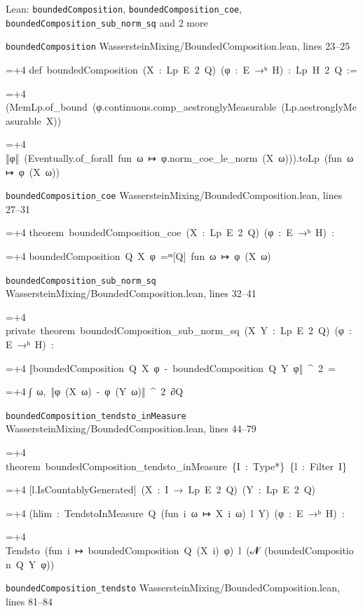\documentclass[11pt,a4paper]{report}
\newlength{\leancharwidth}
\newenvironment{leancode}{\par\smallskip\begingroup\ttfamily\footnotesize\raggedright
  \settowidth{\leancharwidth}{M}\setlength{\parskip}{0pt}\setlength{\parindent}{0pt}
  \frenchspacing}{\par\endgroup\smallskip}
\newcommand{\leanline}[2]{\hangindent=\dimexpr#1\leancharwidth+4\leancharwidth\relax
  \hangafter=1\noindent\hspace*{#1\leancharwidth}#2\par}
\newcommand{\leansource}[1]{\par{\footnotesize\color{leanmuted}#1}\par}
\begin{document}
\begin{leanbox}{Lean: \texttt{boundedComposition}, \texttt{boundedComposition\_\allowbreak{}coe}, \texttt{boundedComposition\_\allowbreak{}sub\_\allowbreak{}norm\_\allowbreak{}sq} and 2 more}
\leansource{\texttt{boundedComposition} \quad WassersteinMixing/\allowbreak{}BoundedComposition.lean, lines 23–25}
\begin{leancode}
\leanline{0}{def\ boundedComposition\ (X\ :\ Lp\ E\ 2\ Q)\ (φ\ :\ E\ →ᵇ\ H)\ :\ Lp\ H\ 2\ Q\ :=}
\leanline{2}{(MemLp.of\_bound\ (φ.continuous.comp\_aestronglyMeasurable\ (Lp.aestronglyMeasurable\ X))}
\leanline{4}{‖φ‖\ (Eventually.of\_forall\ fun\ ω\ ↦\ φ.norm\_coe\_le\_norm\ (X\ ω))).toLp\ (fun\ ω\ ↦\ φ\ (X\ ω))}
\end{leancode}
\leansource{\texttt{boundedComposition\_\allowbreak{}coe} \quad WassersteinMixing/\allowbreak{}BoundedComposition.lean, lines 27–31}
\begin{leancode}
\leanline{0}{theorem\ boundedComposition\_coe\ (X\ :\ Lp\ E\ 2\ Q)\ (φ\ :\ E\ →ᵇ\ H)\ :}
\leanline{4}{boundedComposition\ Q\ X\ φ\ =ᵐ[Q]\ fun\ ω\ ↦\ φ\ (X\ ω)}
\end{leancode}
\leansource{\texttt{boundedComposition\_\allowbreak{}sub\_\allowbreak{}norm\_\allowbreak{}sq} \quad WassersteinMixing/\allowbreak{}BoundedComposition.lean, lines 32–41}
\begin{leancode}
\leanline{0}{private\ theorem\ boundedComposition\_sub\_norm\_sq\ (X\ Y\ :\ Lp\ E\ 2\ Q)\ (φ\ :\ E\ →ᵇ\ H)\ :}
\leanline{4}{‖boundedComposition\ Q\ X\ φ\ -\ boundedComposition\ Q\ Y\ φ‖\ \textasciicircum{}\ 2\ =}
\leanline{6}{∫\ ω,\ ‖φ\ (X\ ω)\ -\ φ\ (Y\ ω)‖\ \textasciicircum{}\ 2\ ∂Q}
\end{leancode}
\leansource{\texttt{boundedComposition\_\allowbreak{}tendsto\_\allowbreak{}inMeasure} \quad WassersteinMixing/\allowbreak{}BoundedComposition.lean, lines 44–79}
\begin{leancode}
\leanline{0}{theorem\ boundedComposition\_tendsto\_inMeasure\ \{I\ :\ Type*\}\ \{l\ :\ Filter\ I\}}
\leanline{4}{[l.IsCountablyGenerated]\ (X\ :\ I\ →\ Lp\ E\ 2\ Q)\ (Y\ :\ Lp\ E\ 2\ Q)}
\leanline{4}{(hlim\ :\ TendstoInMeasure\ Q\ (fun\ i\ ω\ ↦\ X\ i\ ω)\ l\ Y)\ (φ\ :\ E\ →ᵇ\ H)\ :}
\leanline{4}{Tendsto\ (fun\ i\ ↦\ boundedComposition\ Q\ (X\ i)\ φ)\ l\ ({\leanfallback 𝓝}\ (boundedComposition\ Q\ Y\ φ))}
\end{leancode}
\leansource{\texttt{boundedComposition\_\allowbreak{}tendsto} \quad WassersteinMixing/\allowbreak{}BoundedComposition.lean, lines 81–84}
\begin{leancode}

\end{leancode}
\end{leanbox}
\end{document}
